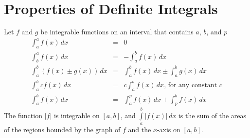 \documentclass{article}
\begin{document}
\section*{Properties of Definite Integrals}
Let $f$ and $g$ be integrable functions on an interval that contains $a$, $b$, and $p$
\begin{eqnarray}
    \int_a^a{f(x)\,dx} &=& 0 \\
    \int_b^a{f(x)\,dx} &=& -\int_a^b{f(x)\,dx} \\
    \int_a^b{\left(f(x) \pm g(x)\right)\,dx} &=& \int_a^b{f(x)\,dx} \pm \int_a^b{g(x)\,dx} \\
    \int_a^b{cf(x)\,dx} &=& c\int_a^b{f(x)\,dx}\text{, for any constant } c \\
    \int_a^b{f(x)\,dx} &=& \int_a^p{f(x)\,dx} + \int_p^b{f(x)\,dx}
\end{eqnarray}
\hspace{0.5cm} The function $|f|$ is integrable on $[a,b]$, and $\int\limits_a^b{|f(x)|\,dx}$ is the sum of the areas of the regions bounded by the graph of $f$ and the $x$-axis on $[a,b]$.
\end{document}
